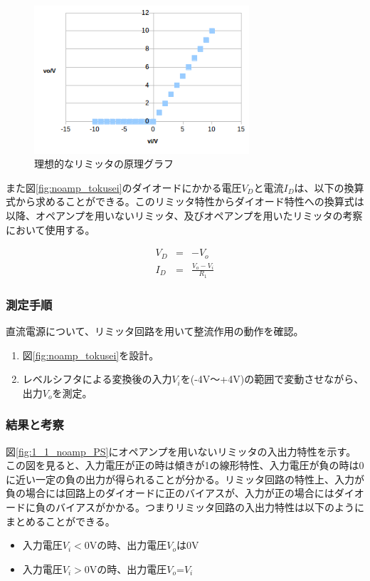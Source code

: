 \documentclass[11pt,a4j]{jsarticle}
\begin{document}
    \begin{figure}[htbp]
  \centering
  \includegraphics[width=8cm,clip]{risou_limitter.png}
  \caption{理想的なリミッタの原理グラフ}
  \label{fig:risou_limitter}
 \end{figure}
 
  また図\ref{fig:noamp_tokusei}のダイオードにかかる電圧$V_D$と電流$I_D$は、以下の換算式から求めることができる。このリミッタ特性からダイオード特性への換算式は以降、オペアンプを用いないリミッタ、及びオペアンプを用いたリミッタの考察において使用する。
  
  \begin{eqnarray}
  V_D &=& - V_o \label{equ:6} \\
  I_D &=& \frac{V_o - V_i}{R_1} \label{equ:7}
  \end{eqnarray}
    
    
    
   \subsubsection{測定手順}
    直流電源について、リミッタ回路を用いて整流作用の動作を確認。
    \begin{enumerate}
    \item 図\ref{fig:noamp_tokusei}を設計。
    \item レベルシフタによる変換後の入力$V_i$を(-4V～+4V)の範囲で変動させながら、出力$V_o$を測定。
    \end{enumerate}
    
   \subsubsection{結果と考察} \label{sec:noamp_tokusei}
    図\ref{fig:1_1_noamp_PS}にオペアンプを用いないリミッタの入出力特性を示す。
    この図を見ると、入力電圧が正の時は傾きが1の線形特性、入力電圧が負の時は0に近い一定の負の出力が得られることが分かる。リミッタ回路の特性上、入力が負の場合には回路上のダイオードに正のバイアスが、入力が正の場合にはダイオードに負のバイアスがかかる。つまりリミッタ回路の入出力特性は以下のようにまとめることができる。
    \begin{itemize}
    \item 入力電圧$V_i < 0$Vの時、出力電圧$V_o$は0V
    \item 入力電圧$V_i > 0$Vの時、出力電圧$V_o$=$V_i$
    \end{itemize}
    
\end{document}
